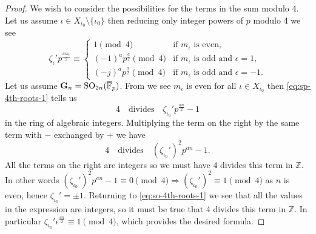 \documentclass{jt-calcs}
\renewcommand{\cref}{\Cref}
\begin{document}
\begin{proof}
We wish to consider the possibilities for the terms in the sum modulo 4. Let us assume $\iota \in X_{\iota_0} \setminus \{\iota_0\}$ then reducing only integer powers of $p$ modulo 4 we see
\begin{equation*}
\zeta_{\iota}'p^{\frac{am_i}{2}} \equiv \begin{cases}
1 \pmod{4} &\text{if }m_{\iota}\text{ is even},\\
(-1)^ap^{\frac{a}{2}} \pmod{4} &\text{if }m_{\iota}\text{ is odd and }\epsilon=1,\\
(-j)^ap^{\frac{a}{2}} \pmod{4} &\text{if }m_{\iota}\text{ is odd and }\epsilon=-1.
\end{cases}
\end{equation*}
Let us assume $\mathbf{G}_n = \operatorname{SO}_{2n}(\overline{\mathbb{F}}_p)$. From \cref{tab:cond-cuspidal} we see $m_{\iota}$ is even for all $\iota \in X_{\iota_0}$ then \eqref{eq:sp-4th-roots-1} tells us
\begin{equation}\label{eq:so-4th-roots-1}
4\quad\text{divides}\quad\zeta_{\iota_0}'p^{\frac{an}{2}} - 1
\end{equation}
in the ring of algebraic integers. Multiplying the term on the right by the same term with $-$ exchanged by $+$ we have
\begin{equation*}
4\quad\text{divides}\quad(\zeta_{\iota_0}')^2p^{an} - 1.
\end{equation*}
All the terms on the right are integers so we must have 4 divides this term in $\mathbb{Z}$. In other words $(\zeta_{\iota_0}')^2p^{an} - 1 \equiv 0 \pmod{4} \Rightarrow (\zeta_{\iota_0}')^2 \equiv 1 \pmod{4}$ as $n$ is even, hence $\zeta_{\iota_0}' = \pm 1$. Returning to \eqref{eq:so-4th-roots-1} we see that all the values in the expression are integers, so it must be true that 4 divides this term in $\mathbb{Z}$. In particular $\zeta_{\iota_0}'\epsilon^{\frac{an}{2}} \equiv 1 \pmod{4}$, which provides the desired formula.


\end{proof}
\end{document}
